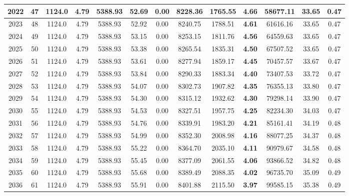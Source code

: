 {\begin{center}
\begin{tabular}[htb]{|c|c||c|c|c|c|c|c||c|c||c|c|c||}
\hline 
 2022 &  47 &  1124.0 &  4.79 &  5388.93 &  52.69 &  0.00 &  8228.36 &  1765.55 &  {\bf 4.66} &  58677.11 &  33.65 &  0.47 \\ 
\hline 
 2023 &  48 &  1124.0 &  4.79 &  5388.93 &  52.92 &  0.00 &  8240.75 &  1788.51 &  {\bf 4.61} &  61616.16 &  33.65 &  0.47 \\ 
\hline 
 2024 &  49 &  1124.0 &  4.79 &  5388.93 &  53.15 &  0.00 &  8253.15 &  1811.76 &  {\bf 4.56} &  64559.63 &  33.65 &  0.47 \\ 
\hline 
 2025 &  50 &  1124.0 &  4.79 &  5388.93 &  53.38 &  0.00 &  8265.54 &  1835.31 &  {\bf 4.50} &  67507.52 &  33.65 &  0.47 \\ 
\hline 
 2026 &  51 &  1124.0 &  4.79 &  5388.93 &  53.61 &  0.00 &  8277.94 &  1859.17 &  {\bf 4.45} &  70457.57 &  33.67 &  0.47 \\ 
\hline 
 2027 &  52 &  1124.0 &  4.79 &  5388.93 &  53.84 &  0.00 &  8290.33 &  1883.34 &  {\bf 4.40} &  73407.53 &  33.72 &  0.47 \\ 
\hline 
 2028 &  53 &  1124.0 &  4.79 &  5388.93 &  54.07 &  0.00 &  8302.73 &  1907.82 &  {\bf 4.35} &  76355.13 &  33.80 &  0.47 \\ 
\hline 
 2029 &  54 &  1124.0 &  4.79 &  5388.93 &  54.30 &  0.00 &  8315.12 &  1932.62 &  {\bf 4.30} &  79298.14 &  33.90 &  0.47 \\ 
\hline 
 2030 &  55 &  1124.0 &  4.79 &  5388.93 &  54.53 &  0.00 &  8327.51 &  1957.75 &  {\bf 4.25} &  82234.30 &  34.03 &  0.47 \\ 
\hline 
 2031 &  56 &  1124.0 &  4.79 &  5388.93 &  54.76 &  0.00 &  8339.91 &  1983.20 &  {\bf 4.21} &  85161.41 &  34.19 &  0.48 \\ 
\hline 
 2032 &  57 &  1124.0 &  4.79 &  5388.93 &  54.99 &  0.00 &  8352.30 &  2008.98 &  {\bf 4.16} &  88077.25 &  34.37 &  0.48 \\ 
\hline 
 2033 &  58 &  1124.0 &  4.79 &  5388.93 &  55.22 &  0.00 &  8364.70 &  2035.10 &  {\bf 4.11} &  90979.67 &  34.58 &  0.48 \\ 
\hline 
 2034 &  59 &  1124.0 &  4.79 &  5388.93 &  55.45 &  0.00 &  8377.09 &  2061.55 &  {\bf 4.06} &  93866.52 &  34.82 &  0.48 \\ 
\hline 
 2035 &  60 &  1124.0 &  4.79 &  5388.93 &  55.68 &  0.00 &  8389.49 &  2088.35 &  {\bf 4.02} &  96735.70 &  35.09 &  0.49 \\ 
\hline 
 2036 &  61 &  1124.0 &  4.79 &  5388.93 &  55.91 &  0.00 &  8401.88 &  2115.50 &  {\bf 3.97} &  99585.15 &  35.38 &  0.49 \\ 

\end{tabular}
\end{center}}
